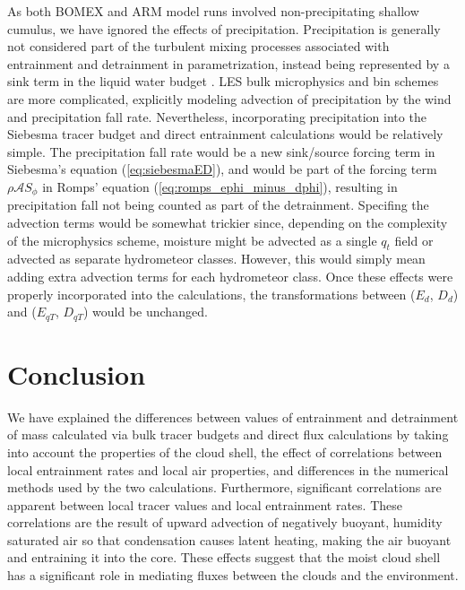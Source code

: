 \documentclass[12pt]{article}
\begin{document}
As both BOMEX and ARM model runs involved non-precipitating shallow cumulus, 
we have ignored the effects of precipitation.  Precipitation is generally not
considered part of the turbulent mixing processes associated with entrainment 
and detrainment in parametrization, instead being represented by a sink 
term in the liquid water budget \citep{Tiedtke1989, Kain1990}.  LES bulk microphysics and bin schemes 
are more complicated, explicitly modeling 
advection of precipitation by the wind and precipitation fall rate.  
Nevertheless, incorporating precipitation into the Siebesma tracer budget 
and direct entrainment calculations would be relatively simple.  The
precipitation fall rate would be a new sink/source forcing term in Siebesma's
equation (\ref{eq:siebesmaED}),
and would be part of the forcing term $\rho \mathcal{A}S_\phi$ in Romps'
 equation (\ref{eq:romps_ephi_minus_dphi}), resulting in precipitation fall 
not being counted as part of the detrainment.  Specifing the advection terms would
be somewhat trickier since, depending on the complexity of the microphysics 
scheme, moisture might be advected as a single $q_t$ field or advected as 
separate hydrometeor classes.  However, this would simply mean adding extra 
advection terms for each hydrometeor class.  Once these effects were properly
incorporated into the calculations, the transformations between 
($E_d$, $D_d$) and ($E_{qT}$, $D_{qT}$) would be unchanged.


\section{Conclusion}

We have explained the differences between values of entrainment and detrainment 
of mass calculated via bulk tracer budgets and direct flux calculations by 
taking into account the properties of the cloud shell, the effect of 
correlations between local entrainment rates and local air properties, 
and differences in the numerical methods used by the two calculations.  
Furthermore, significant correlations are apparent between local tracer 
values and local entrainment rates.  These correlations are the result of 
upward advection of negatively buoyant, humidity saturated air so that
condensation causes latent heating, making the air buoyant and entraining it 
into the core.  These effects suggest that the moist cloud shell has a
significant role in mediating fluxes between the clouds and the environment. 
\end{document}
